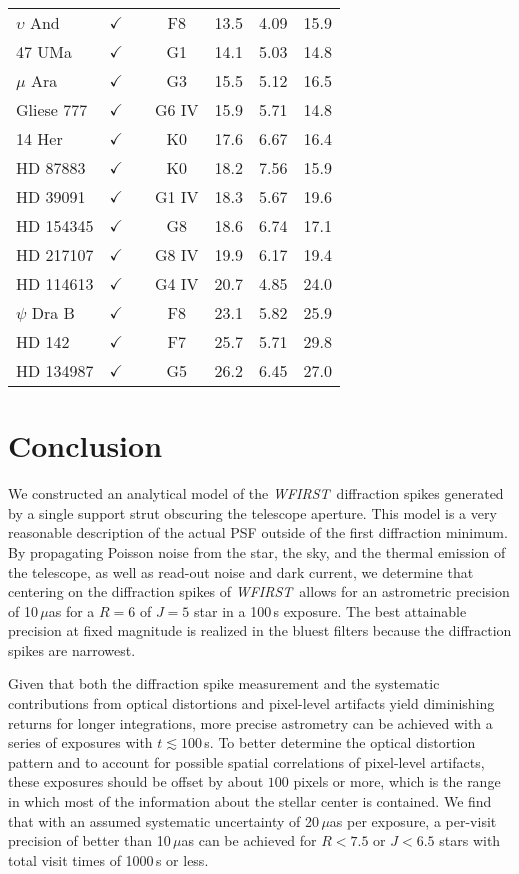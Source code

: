 \documentclass[modern, times]{aastex61}
\newcommand\wfirst{\textit{WFIRST}}
\begin{document}
\begin{table}[t]
\begin{tabular}{lcccccc}
$\upsilon$ And & $\checkmark$ & & F8 & 13.5 & 4.09 & 15.9\\
47 UMa & $\checkmark$ & & G1 & 14.1 & 5.03 & 14.8\\
$\mu$ Ara  & $\checkmark$ & & G3 & 15.5 & 5.12 & 16.5\\
Gliese 777 & $\checkmark$ & & G6 IV & 15.9 & 5.71 & 14.8\\
14 Her & $\checkmark$ & & K0 & 17.6 & 6.67 & 16.4\\
HD 87883 & $\checkmark$ & & K0 & 18.2 & 7.56 & 15.9\\
HD 39091 & $\checkmark$ & & G1 IV & 18.3 & 5.67 & 19.6\\
HD 154345 & $\checkmark$ & & G8 & 18.6 & 6.74 & 17.1\\
HD 217107 & $\checkmark$ & & G8 IV & 19.9 & 6.17 & 19.4\\
HD 114613 & $\checkmark$ & & G4 IV & 20.7 & 4.85 & 24.0\\
$\psi$ Dra B & $\checkmark$ & & F8 & 23.1 & 5.82 & 25.9\\
HD 142 & $\checkmark$ & & F7 & 25.7 & 5.71 & 29.8\\
HD 134987 & $\checkmark$ & & G5 & 26.2 & 6.45 & 27.0\\
\hline
\end{tabular}
\end{table}

\section{Conclusion}
\label{sec:conclusion}

We constructed an analytical model of the \wfirst\ diffraction spikes generated by a single support strut obscuring the telescope aperture.
This model is a very reasonable description of the actual PSF outside of the first diffraction minimum.
By propagating Poisson noise from the star, the sky, and the thermal emission of the telescope, as well as read-out noise and dark current, we determine that centering on the diffraction spikes of \wfirst\ allows for an astrometric precision of 10\,$\mu$as for a $R=6$ of $J=5$ star in a 100\,s exposure.
The best attainable precision at fixed magnitude is realized in the bluest filters because the diffraction spikes are narrowest.

Given that both the diffraction spike measurement and the systematic contributions from optical distortions and pixel-level artifacts yield diminishing returns for longer integrations, more precise astrometry can be achieved with a series of exposures with $t\lesssim100$\,s.
To better determine the optical distortion pattern and to account for possible spatial correlations of pixel-level artifacts, these exposures should be offset by about $100$ pixels or more, which is the range in which most of the information about the stellar center is contained.
We find that with an assumed systematic uncertainty of 20\,$\mu$as per exposure, a per-visit precision of better than 10\,$\mu$as can be achieved for $R<7.5$ or $J<6.5$ stars with total visit times of 1000\,s or less.
\end{document}

